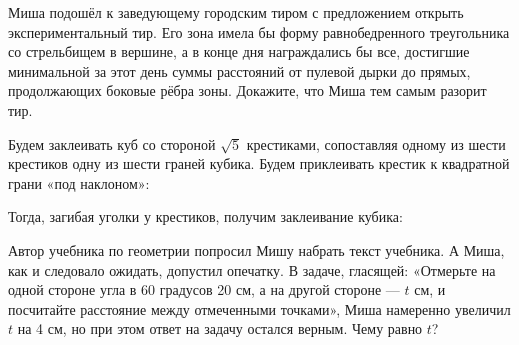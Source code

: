 \begin{itemize}
\itA Миша подошёл к заведующему городским тиром с предложением открыть экспериментальный тир. Его зона имела бы форму равнобедренного треугольника со стрельбищем в вершине, а в конце дня награждались бы все, достигшие минимальной за этот день суммы расстояний от пулевой дырки до прямых, продолжающих боковые рёбра зоны. Докажите, что Миша тем самым разорит тир.

\itB Будем заклеивать куб со стороной $\sqrt 5$ крестиками, сопоставляя одному из шести крестиков одну из шести граней кубика. Будем приклеивать крестик к квадратной грани «под наклоном»:

\begin{center}
\end{center}

Тогда, загибая уголки у крестиков, получим заклеивание кубика:

\begin{center}
\end{center}

\itC Автор учебника по геометрии попросил Мишу набрать текст учебника. А Миша, как и следовало ожидать, допустил опечатку. В задаче, гласящей: «Отмерьте на одной стороне угла в 60 градусов 20 см, а на другой стороне — $t$ см, и посчитайте расстояние между отмеченными точками», Миша намеренно увеличил $t$ на 4 см, но при этом ответ на задачу остался верным. Чему равно $t$?
\end{itemize}
